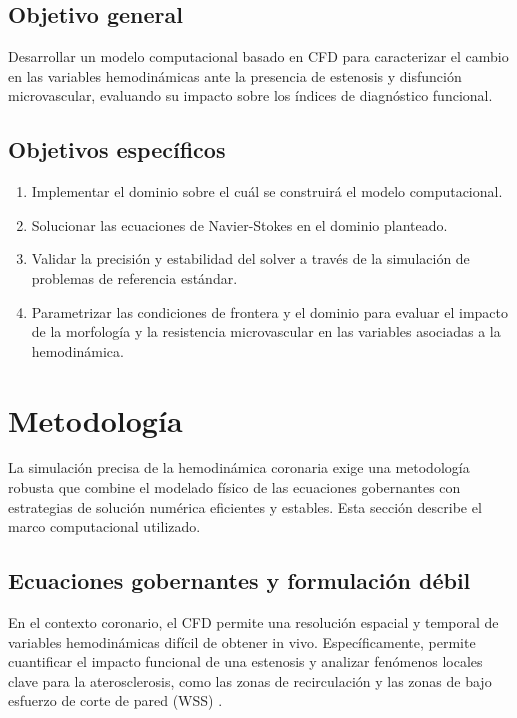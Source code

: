 \documentclass[12pt, letterpaper]{article}
\begin{document}
\subsection{Objetivo general}
Desarrollar un modelo computacional basado en CFD para caracterizar el cambio en las variables hemodinámicas ante la presencia de estenosis y disfunción microvascular, evaluando su impacto sobre los índices de diagnóstico funcional.

\subsection{Objetivos específicos}
\begin{enumerate}[label=\thesubsection.\arabic*]
    \item Implementar el dominio sobre el cuál se construirá el modelo computacional.
    \item Solucionar las ecuaciones de Navier-Stokes en el dominio planteado.
    \item Validar la precisión y estabilidad del solver a través de la simulación de problemas de referencia estándar.
    \item Parametrizar las condiciones de frontera y el dominio para evaluar el impacto de la morfología y la resistencia microvascular en las variables asociadas a la hemodinámica.
\end{enumerate}

\section{Metodología}
La simulación precisa de la hemodinámica coronaria exige una metodología robusta que combine el modelado físico de las ecuaciones gobernantes con estrategias de solución numérica eficientes y estables. Esta sección describe el marco computacional utilizado.

\subsection{Ecuaciones gobernantes y formulación débil}

En el contexto coronario, el CFD permite una resolución espacial y temporal de variables hemodinámicas difícil de obtener in vivo. Específicamente, permite cuantificar el impacto funcional de una estenosis y analizar fenómenos locales clave para la aterosclerosis, como las zonas de recirculación y las zonas de bajo esfuerzo de corte de pared (WSS) \cite{malek_hemodynamic_1999}.
\end{document}
